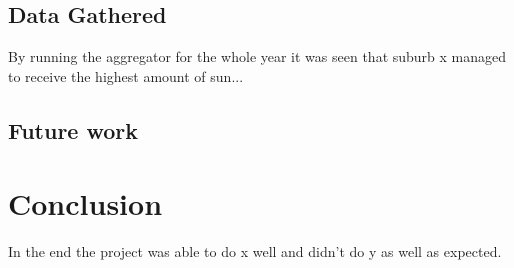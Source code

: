 \documentclass[12pt]{report}
\begin{document}
\section{Data Gathered}
By running the aggregator for the whole year it was seen that suburb x managed to receive the highest amount of sun...
\section{Future work}
\chapter{Conclusion}
In the end the project was able to do x well and didn't do y as well as expected.


\end{document}
